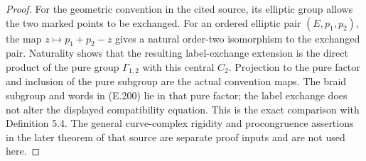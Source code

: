 \begin{proof}
For the geometric convention in the cited source, its
elliptic group allows the two marked points to be exchanged.
For an ordered elliptic pair $(E,p_1,p_2)$, the map
$z\mapsto p_1+p_2-z$ gives a natural order-two isomorphism
to the exchanged pair.  Naturality shows that the resulting
label-exchange extension is the direct product of the pure
group $\Gamma_{1,2}$ with this central $C_2$.  Projection
to the pure factor and inclusion of the pure subgroup are
the actual convention maps.  The braid subgroup and words
in (E.200) lie in that pure factor; the label exchange does
not alter the displayed compatibility equation.
This is the exact comparison with Definition 5.4.  The
general curve-complex rigidity and procongruence assertions
in the later theorem of that source are separate proof
inputs and are not used here.
\end{proof}
